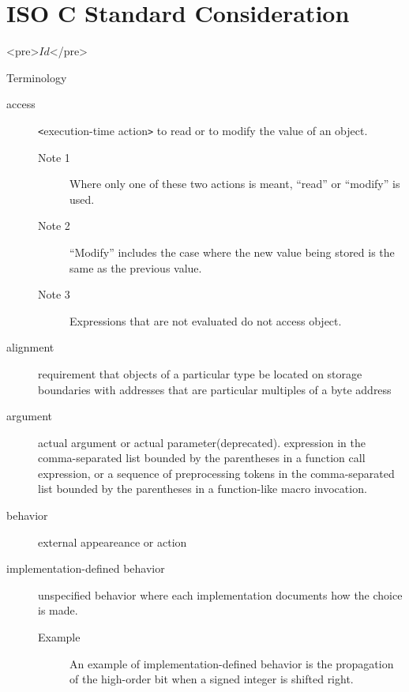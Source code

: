 \chapter{ISO C Standard Consideration}

\begin{rawhtml}
<pre>$Id$</pre>
\end{rawhtml}

\begin{faq}
 Terminology

\A 
\begin{description}
        \item[access] 
        \verb+<+execution-time action\verb+>+
        to read or to modify the
        value of an object.
        \begin{description}
                \item[Note 1] Where only one of these two actions is
                meant, ``read'' or ``modify'' is used. 
                \item[Note 2] ``Modify'' includes the case where the new value
                being stored is the same as the previous value.
                \item[Note 3] Expressions that are not evaluated do not access 
                object.
        \end{description}

        \item[alignment] requirement that objects of a particular type be
        located on storage boundaries with addresses that are particular
        multiples of a byte address

        \item[argument] actual argument or actual parameter(deprecated).
        expression in the comma-separated list bounded by the parentheses
        in a function call expression, or a sequence of preprocessing tokens in
        the comma-separated list bounded by the parentheses in a function-like
        macro invocation.

        \item[behavior] external appeareance or action

        \item[implementation-defined behavior]
        unspecified behavior where each implementation documents how the
        choice is made.
        \begin{description}
                \item[Example] An example of implementation-defined behavior is
                        the propagation of the high-order bit when a signed 
                        integer is shifted right.
        \end{description}
        

\end{description}
\end{faq}

